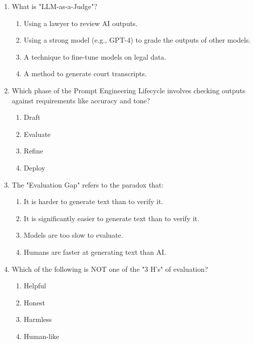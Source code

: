 \documentclass[11pt,a4paper]{article}
\begin{document}
\begin{enumerate}[leftmargin=*, label=\textbf{\#\arabic*}]
  \item What is "LLM-as-a-Judge"?\\
    \begin{enumerate}[label=\Alph*)]
      \item Using a lawyer to review AI outputs.
      \item Using a strong model (e.g., GPT-4) to grade the outputs of other models.
      \item A technique to fine-tune models on legal data.
      \item A method to generate court transcripts.
    \end{enumerate}

  \item Which phase of the Prompt Engineering Lifecycle involves checking outputs against requirements like accuracy and tone?\\
    \begin{enumerate}[label=\Alph*)]
      \item Draft
      \item Evaluate
      \item Refine
      \item Deploy
    \end{enumerate}

  \item The "Evaluation Gap" refers to the paradox that:\\
    \begin{enumerate}[label=\Alph*)]
      \item It is harder to generate text than to verify it.
      \item It is significantly easier to generate text than to verify it.
      \item Models are too slow to evaluate.
      \item Humans are faster at generating text than AI.
    \end{enumerate}

  \item Which of the following is NOT one of the "3 H's" of evaluation?\\
    \begin{enumerate}[label=\Alph*)]
      \item Helpful
      \item Honest
      \item Harmless
      \item Human-like
    \end{enumerate}


\end{enumerate}
\end{document}

